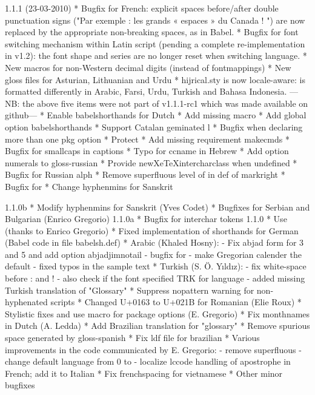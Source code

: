 1.1.1 (23-03-2010)
  * Bugfix for French: explicit spaces before/after double punctuation
    signs ("Par exemple : les grands « espaces » du Canada ! ") are
    now replaced by the appropriate non-breaking spaces, as in Babel.
  * Bugfix for font switching mechanism within Latin script
    (pending a complete re-implementation in v1.2):
    the font shape and series are no longer reset when switching language.
  * New macros for non-Western decimal digits
    (instead of fontmappings)
  * New gloss files for Asturian, Lithuanian and Urdu
  * hijrical.sty is now locale-aware: \hijritoday is
    formatted differently in Arabic, Farsi, Urdu, Turkish
    and Bahasa Indonesia.
---NB: the above five items were not part of v1.1.1-rc1 which was made available on github---
  * Enable babelshorthands for Dutch
  * Add missing macro \allowhyphens
  * Add global option babelshorthands
  * Support Catalan geminated l
  * Bugfix when declaring more than one pkg option
  * Protect \reset@font
  * Add missing requirement makecmds
  * Bugfix for smallcaps in captions
  * Typo for ccname in Hebrew
  * Add option numerals to gloss-russian
  * Provide newXeTeXintercharclass when undefined
  * Bugfix for Russian alph
  * Remove superfluous level of {} in def of markright
  * Bugfix for \datecatalan
  * Change hyphenmins for Sanskrit

1.1.0b
   * Modify hyphenmins for Sanskrit (Yves Codet)
   * Bugfixes for Serbian and Bulgarian (Enrico Gregorio)
1.1.0a
   * Bugfix for interchar tokens
1.1.0
   * Use \newXeTeXintercharclass (thanks to Enrico Gregorio)
   * Fixed implementation of shorthands for German (Babel code in file babelsh.def)
   * Arabic (Khaled Hosny):
     - Fix abjad form for 3 and 5 and add option abjadjimnotail
     - bugfix for \arabicnumber
     - make Gregorian calender the default
     - fixed typos in the sample text
   * Turkish (S. Ö. Yıldız):
     - fix white-space before : and !
     - also check if the font specified TRK for language
     - added missing Turkish translation of "Glossary"
   * Suppress nopattern warning for non-hyphenated scripts
   * Changed U+0163 to U+021B for Romanian (Elie Roux)
   * Stylistic fixes and use macro \xpg@option for package options (E. Gregorio)
   * Fix monthnames in Dutch (A. Ledda)
   * Add Brazilian translation for "glossary"
   * Remove spurious space generated by gloss-spanish
   * Fix ldf file for brazilian
   * Various improvements in the code communicated by E. Gregorio:
     - remove superfluous \protect\language
     - change default language from 0 to 
     - localize lccode handling of apostrophe in French; add it to Italian
   * Fix frenchspacing for vietnamese
   * Other minor bugfixes

